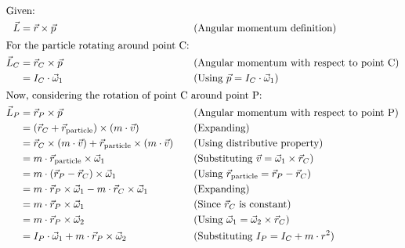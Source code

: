 \begin{solution}
         
            \setlength{\jot}{10pt}
                    \begin{align*}   
                        \intertext{Given:}
                        \vec{L} &= \vec{r} \times \vec{p} &&\quad \text{(Angular momentum definition)} \\
                        \intertext{For the particle rotating around point C:}
                        \vec{L}_C &= \vec{r}_C \times \vec{p} &&\quad \text{(Angular momentum with respect to point C)} \\
                                  &= I_C \cdot \vec{\omega}_1 &&\quad \text{(Using \( \vec{p} = I_C \cdot \vec{\omega}_1 \))} \\
                        \intertext{Now, considering the rotation of point C around point P:}
                        \vec{L}_P &= \vec{r}_P \times \vec{p} &&\quad \text{(Angular momentum with respect to point P)} \\
                                  &= (\vec{r}_C + \vec{r}_{\text{particle}}) \times (m \cdot \vec{v}) &&\quad \text{(Expanding)} \\
                                  &= \vec{r}_C \times (m \cdot \vec{v}) + \vec{r}_{\text{particle}} \times (m \cdot \vec{v}) &&\quad \text{(Using distributive property)} \\
                                  &= m \cdot \vec{r}_{\text{particle}} \times \vec{\omega}_1 &&\quad \text{(Substituting \( \vec{v} = \vec{\omega}_1 \times \vec{r}_C \))} \\
                                  &= m \cdot (\vec{r}_P - \vec{r}_C) \times \vec{\omega}_1 &&\quad \text{(Using \( \vec{r}_{\text{particle}} = \vec{r}_P - \vec{r}_C \))} \\
                                  &= m \cdot \vec{r}_P \times \vec{\omega}_1 - m \cdot \vec{r}_C \times \vec{\omega}_1 &&\quad \text{(Expanding)} \\
                                  &= m \cdot \vec{r}_P \times \vec{\omega}_1 &&\quad \text{(Since \( \vec{r}_C \) is constant)} \\
                                  &= m \cdot \vec{r}_P \times \vec{\omega}_2 &&\quad \text{(Using \( \vec{\omega}_1 = \vec{\omega}_2 \times \vec{r}_C \))} \\
                                  &= I_P \cdot \vec{\omega}_1 + m \cdot \vec{r}_P \times \vec{\omega}_2 &&\quad \text{(Substituting \( I_P = I_C + m \cdot r^2 \))}
                    \end{align*}
                        

\end{solution}
